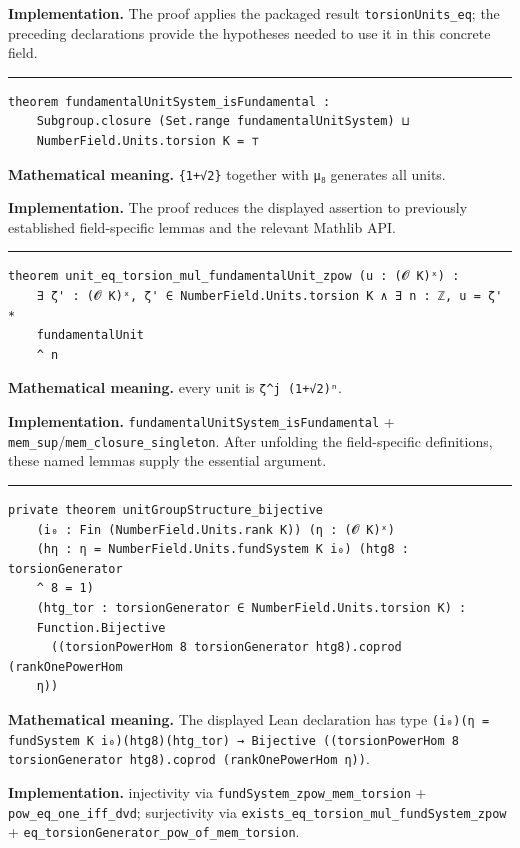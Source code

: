 \documentclass[UTF8,a4paper,11pt,fontset=fandol]{ctexart}
\theoremstyle{definition}
\newcommand{\statementsep}{\par\medskip\hrule\medskip}
\begin{document}
\noindent\textbf{Implementation.} The proof applies the packaged result \texttt{torsionUnits\_\allowbreak{}eq}; the preceding declarations provide the hypotheses needed to use it in this concrete field.\par
\statementsep
\begin{verbatim}
theorem fundamentalUnitSystem_isFundamental :
    Subgroup.closure (Set.range fundamentalUnitSystem) ⊔
    NumberField.Units.torsion K = ⊤
\end{verbatim}
\noindent\textbf{Mathematical meaning.} \texttt{\{1+√2\}} together with μ₈ generates all units.\par
\noindent\textbf{Implementation.} The proof reduces the displayed assertion to previously established field-specific lemmas and the relevant Mathlib API.\par
\statementsep
\begin{verbatim}
theorem unit_eq_torsion_mul_fundamentalUnit_zpow (u : (𝓞 K)ˣ) :
    ∃ ζ' : (𝓞 K)ˣ, ζ' ∈ NumberField.Units.torsion K ∧ ∃ n : ℤ, u = ζ' *
    fundamentalUnit
    ^ n
\end{verbatim}
\noindent\textbf{Mathematical meaning.} every unit is \texttt{ζ\textasciicircum{}j (1+√2)ⁿ}.\par
\noindent\textbf{Implementation.} \texttt{fundamentalUnitSystem\_\allowbreak{}isFundamental} + \texttt{mem\_\allowbreak{}sup}/\texttt{mem\_\allowbreak{}closure\_\allowbreak{}singleton}. After unfolding the field-specific definitions, these named lemmas supply the essential argument.\par
\statementsep
\begin{verbatim}
private theorem unitGroupStructure_bijective
    (i₀ : Fin (NumberField.Units.rank K)) (η : (𝓞 K)ˣ)
    (hη : η = NumberField.Units.fundSystem K i₀) (htg8 : torsionGenerator
    ^ 8 = 1)
    (htg_tor : torsionGenerator ∈ NumberField.Units.torsion K) :
    Function.Bijective
      ((torsionPowerHom 8 torsionGenerator htg8).coprod (rankOnePowerHom
    η))
\end{verbatim}
\noindent\textbf{Mathematical meaning.} The displayed Lean declaration has type \texttt{(i₀)(η = fundSystem K i₀)(htg8)(htg\_\allowbreak{}tor) → Bijective ((torsionPowerHom 8 torsionGenerator htg8).\allowbreak{}coprod (rankOnePowerHom η))}.\par
\noindent\textbf{Implementation.} injectivity via \texttt{fundSystem\_\allowbreak{}zpow\_\allowbreak{}mem\_\allowbreak{}torsion} + \texttt{pow\_\allowbreak{}eq\_\allowbreak{}one\_\allowbreak{}iff\_\allowbreak{}dvd}; surjectivity via \texttt{exists\_\allowbreak{}eq\_\allowbreak{}torsion\_\allowbreak{}mul\_\allowbreak{}fundSystem\_\allowbreak{}zpow} + \texttt{eq\_\allowbreak{}torsionGenerator\_\allowbreak{}pow\_\allowbreak{}of\_\allowbreak{}mem\_\allowbreak{}torsion}.\par
\end{document}
